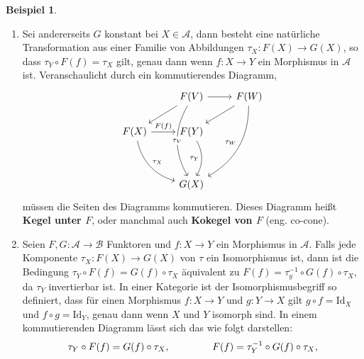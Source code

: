\documentclass[leqno]{article}
\theoremstyle{plain}
\theoremstyle{definition}
\newtheorem{exmp}{Beispiel}[section]
\theoremstyle{remark}
\begin{document}
\begin{exmp}
\begin{enumerate}
	\item Sei andererseits $G$ konstant bei $X \in \mathcal{A}$, dann besteht eine natürliche Transformation aus einer Familie von Abbildungen $\tau_X: F(X) \rightarrow G(X)$, so dass $\tau_Y \circ F(f) = \tau_X$ gilt, genau dann wenn $f: X \rightarrow Y$ ein Morphismus in $\mathcal{A}$ ist. Veranschaulicht durch ein kommutierendes Diagramm,
	\begin{equation}
		\begin{tikzcd}
		                                                         & F(V) \arrow[ld] \arrow[r] \arrow[ddd, "\tau_V" description, bend right, shift left = 0.5] & F(W) \arrow[ld] \arrow[lddd, "\tau_W"', bend left] \\
		F(X) \arrow[r, "F(f)"] \arrow[rdd, "\tau_X", bend right] & F(Y) \arrow[dd, "\tau_Y"', bend left]                                                &                                                    \\
		                                                         &                                                                                      &                                                    \\
		                                                         & G(X)                                                                                 &                                                   
		\end{tikzcd}
	\end{equation}
	müssen die Seiten des Diagramms kommutieren. Dieses Diagramm heißt \textbf{Kegel unter $F$}, oder manchmal auch \textbf{Kokegel von $F$} (eng. co-cone).
	\item Seien $F,G: \mathcal{A} \rightarrow \mathcal{B}$ Funktoren und $f: X \rightarrow Y$ ein Morphismus in $\mathcal{A}$. Falls jede Komponente $\tau_X: F(X) \rightarrow G(X)$ von $\tau$ ein Isomorphismus ist, dann ist die Bedingung $\tau_Y \circ F(f) = G(f) \circ \tau_X$ äquivalent zu $F(f) = \tau_y^{-1} \circ G(f) \circ \tau_X$, da $\tau_Y$ invertierbar ist. In einer Kategorie ist der Isomorphismusbegriff so definiert, dass für einen Morphismus $f:X \rightarrow Y$ und $g:Y \rightarrow X$ gilt $g \circ f = \text{Id}_X$ und $f \circ g = \text{Id}_Y$, genau dann wenn $X$ und $Y$ isomorph sind. In einem kommutierenden Diagramm lässt sich das wie folgt darstellen:
	\begin{equation}
				\tau_Y \circ F(f) = G(f) \circ \tau_X, \hspace{1.5cm} F(f) = \tau_Y^{-1} \circ G(f) \circ \tau_X,

\end{equation}
\end{enumerate}
\end{exmp}
\end{document}
